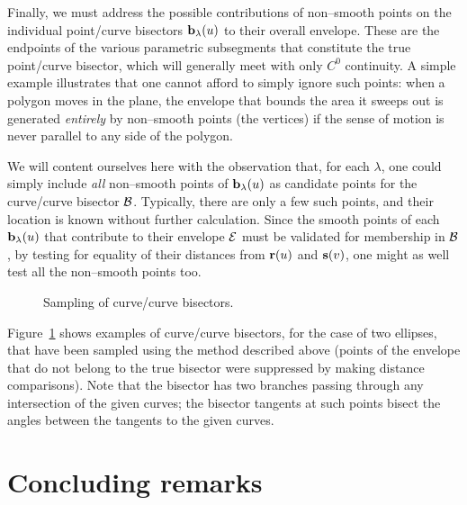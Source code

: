 Finally, we must address the possible contributions of
non--smooth points on the individual point/curve bisectors
${\bf b}_\lambda(u)$ to their overall envelope. These are
the endpoints of the various parametric subsegments that
constitute the true point/curve bisector, which will generally
meet with only $C^0$ continuity. A simple example illustrates
that one cannot afford to simply ignore such points: when a
polygon moves in the plane, the envelope that bounds the area
it sweeps out is generated {\it entirely\/} by non--smooth
points (the vertices) if the sense of motion is never parallel
to any side of the polygon.

We will content ourselves here with the observation that, for
each $\lambda$, one could simply include {\it all\/} non--smooth
points of ${\bf b}_\lambda(u)$ as candidate points for the
curve/curve bisector ${\cal B}$. Typically, there are only a
few such points, and their location is known without further
calculation. Since the smooth points of each ${\bf b}_\lambda(u)$
that contribute to their envelope ${\cal E}$ must be validated
for membership in ${\cal B}$, by testing for equality of their
distances from ${\bf r}(u)$ and ${\bf s}(v)$, one might as well
test all the non--smooth points too.

\begin{figure}[htbp] \vspace{7.2in}
\caption[]{Sampling of curve/curve bisectors.}
\label{fig:etrace} \end{figure}

Figure~\ref{fig:etrace} shows examples of curve/curve bisectors,
for the case of two ellipses, that have been sampled using the
method described above (points of the envelope that do not
belong to the true bisector were suppressed by making distance
comparisons). Note that the bisector has two branches passing
through any intersection of the given curves; the bisector
tangents at such points bisect the angles between the tangents
to the given curves.

\newpage

\section{Concluding remarks}

